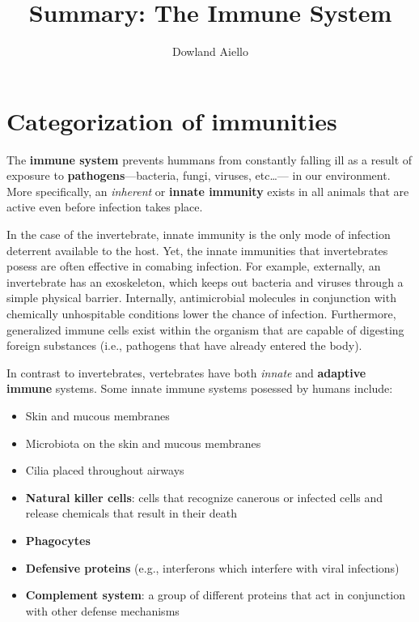 \documentclass{article}
\begin{document}
\title{Summary: The Immune System}
\author{Dowland Aiello}
\date{}

\maketitle
\tableofcontents
\fancyhf{}

\newpage

\section{Categorization of immunities}

The \textbf{immune system} prevents hummans from constantly falling ill as a result
of exposure to \textbf{pathogens}---bacteria, fungi, viruses, etc\ldots--- in our
environment. More specifically, an \emph{inherent} or \textbf{innate immunity}
exists in all animals that are active even before infection takes place.

In the case of the invertebrate, innate immunity is the only mode of infection
deterrent available to the host. Yet, the innate immunities that invertebrates
posess are often effective in comabing infection. For example, externally, an
invertebrate has an exoskeleton, which keeps out bacteria and viruses through a
simple physical barrier. Internally, antimicrobial molecules in conjunction
with chemically unhospitable conditions lower the chance of infection.
Furthermore, generalized immune cells exist within the organism that are
capable of digesting foreign substances (i.e., pathogens that have already
entered the body).

In contrast to invertebrates, vertebrates have both \emph{innate} and
\textbf{adaptive immune} systems. Some innate immune systems posessed
by humans include:

\begin{itemize}
	\item Skin and mucous membranes
	\item Microbiota on the skin and mucous membranes
	\item Cilia placed throughout airways
	\item \textbf{Natural killer cells}: cells that recognize canerous or
		infected cells and release chemicals that result in their death
	\item \textbf{Phagocytes}
	\item \textbf{Defensive proteins} (e.g., interferons which interfere with
		viral infections)
	\item \textbf{Complement system}: a group of different proteins that
		act in conjunction with other defense mechanisms
\end{itemize}
\end{document}
